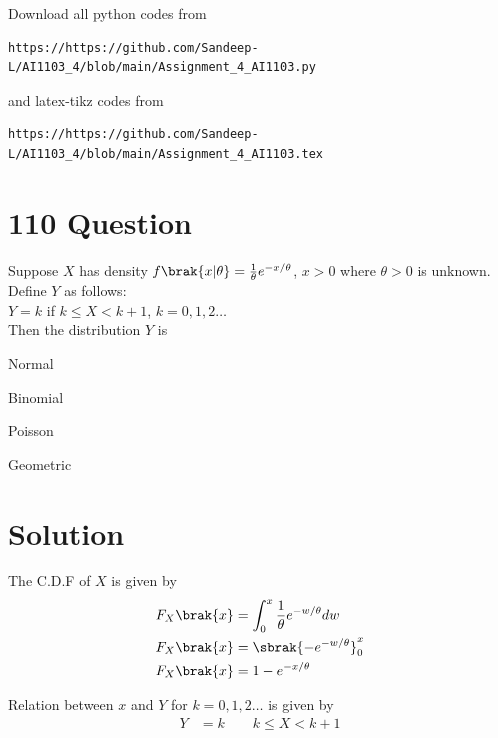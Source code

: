 \documentclass[journal,12pt,twocolumn]{IEEEtran}
\begin{document}
Download all python codes from 
\begin{lstlisting}
https://https://github.com/Sandeep-L/AI1103_4/blob/main/Assignment_4_AI1103.py
\end{lstlisting}
%
and latex-tikz codes from 
%
\begin{lstlisting}
https://https://github.com/Sandeep-L/AI1103_4/blob/main/Assignment_4_AI1103.tex
\end{lstlisting}

\section*{110 Question}

Suppose $X$ has density $f\brak{x|\theta} = \frac{1}{\theta}e^{-x/\theta}$, $x>0$ where $\theta>0$ is unknown. Define $Y$ as follows:\\
$Y=k$ \hfill if \hfill $k\leq X<k+1$, \hfill $k=0,1,2\ldots$\\
Then the distribution $Y$ is
\begin{enumerate}
\begin{multicols}{2}
\setlength\itemsep{0.5em}
    \item Normal
    \item Binomial
    \item Poisson
    \item Geometric
\end{multicols}
\end{enumerate}

\section*{Solution}

The C.D.F of $X$ is given by
\begin{align}
    F_X\brak{x} &= \int_0^x\frac{1}{\theta}e^{-w/\theta}dw\\
    F_X\brak{x} &= \sbrak{-e^{-w/\theta}}_0^x\\
    F_X\brak{x} &= 1 - e^{-x/\theta}
\end{align}

Relation between $x$ and $Y$ for $k=0,1,2\ldots$ is given by
\begin{align}
    Y &= k \qquad k \leq X < k+1
\end{align}
\end{document}
